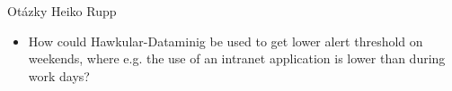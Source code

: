 \documentclass{beamer}
\begin{document}
\begin{frame}{Otázky}
    Heiko Rupp
  \begin{itemize}
    \item How could Hawkular-Dataminig be used to get lower alert threshold on weekends, where
            e.g. the use of an intranet application is lower than during work days?
  \end{itemize}
\end{frame}

\end{document}

